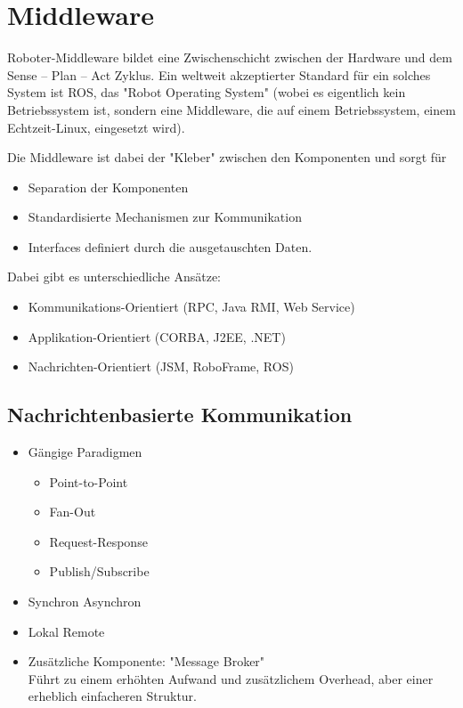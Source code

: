 	\section{Middleware}
		Roboter-Middleware bildet eine Zwischenschicht zwischen der Hardware und dem Sense -- Plan -- Act Zyklus. Ein weltweit akzeptierter Standard für ein solches System ist ROS, das "Robot Operating System" (wobei es eigentlich kein Betriebssystem ist, sondern eine Middleware, die auf einem Betriebssystem, \zB einem Echtzeit-Linux, eingesetzt wird).
		
		Die Middleware ist dabei der "Kleber" zwischen den Komponenten und sorgt für
		\begin{itemize}
			\item Separation der Komponenten
			\item Standardisierte Mechanismen zur Kommunikation
			\item Interfaces definiert durch die ausgetauschten Daten.
		\end{itemize}
		Dabei gibt es unterschiedliche Ansätze:
		\begin{itemize}
			\item Kommunikations-Orientiert (RPC, Java RMI, Web Service)
			\item Applikation-Orientiert (CORBA, J2EE, .NET)
			\item Nachrichten-Orientiert (JSM, RoboFrame, ROS)
		\end{itemize}

		\subsection{Nachrichtenbasierte Kommunikation}
			\begin{itemize}
				\item Gängige Paradigmen
					\begin{itemize}
						\item Point-to-Point
						\item Fan-Out
						\item Request-Response
						\item Publish/Subscribe
					\end{itemize}
				\item Synchron \vs Asynchron
				\item Lokal \vs Remote
				\item Zusätzliche Komponente: "Message Broker" \\ Führt zu einem erhöhten Aufwand und zusätzlichem Overhead, aber einer erheblich einfacheren Struktur.
			\end{itemize}

